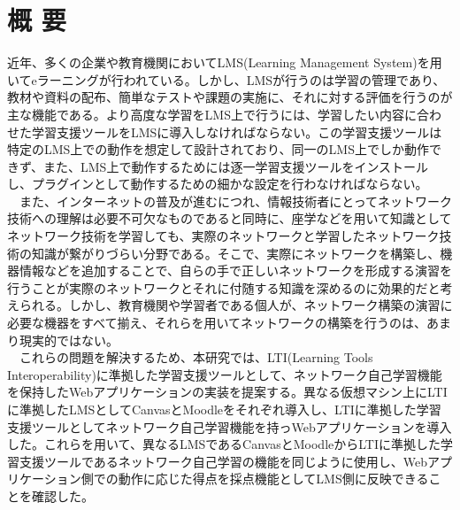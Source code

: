 \section*{\center 概 要}

近年、多くの企業や教育機関においてLMS(Learning Management System)を用いてeラーニングが行われている。しかし、LMSが行うのは学習の管理であり、教材や資料の配布、簡単なテストや課題の実施に、それに対する評価を行うのが主な機能である。より高度な学習をLMS上で行うには、学習したい内容に合わせた学習支援ツールをLMSに導入しなければならない。この学習支援ツールは特定のLMS上での動作を想定して設計されており、同一のLMS上でしか動作できず、また、LMS上で動作するためには逐一学習支援ツールをインストールし、プラグインとして動作するための細かな設定を行わなければならない。\\
　また、インターネットの普及が進むにつれ、情報技術者にとってネットワーク技術への理解は必要不可欠なものであると同時に、座学などを用いて知識としてネットワーク技術を学習しても、実際のネットワークと学習したネットワーク技術の知識が繋がりづらい分野である。そこで、実際にネットワークを構築し、機器情報などを追加することで、自らの手で正しいネットワークを形成する演習を行うことが実際のネットワークとそれに付随する知識を深めるのに効果的だと考えられる。しかし、教育機関や学習者である個人が、ネットワーク構築の演習に必要な機器をすべて揃え、それらを用いてネットワークの構築を行うのは、あまり現実的ではない。\\
　これらの問題を解決するため、本研究では、LTI(Learning Tools Interoperability)に準拠した学習支援ツールとして、ネットワーク自己学習機能を保持したWebアプリケーションの実装を提案する。異なる仮想マシン上にLTIに準拠したLMSとしてCanvasとMoodleをそれぞれ導入し、LTIに準拠した学習支援ツールとしてネットワーク自己学習機能を持っWebアプリケーションを導入した。これらを用いて、異なるLMSであるCanvasとMoodleからLTIに準拠した学習支援ツールであるネットワーク自己学習の機能を同じように使用し、Webアプリケーション側での動作に応じた得点を採点機能としてLMS側に反映できることを確認した。
